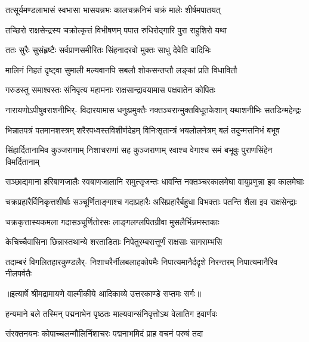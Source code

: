 \twolineshloka
{तत्सूर्यमण्डलाभासं स्वभासा भासयन्नभः}
{कालचक्रनिभं चक्रं मालेः शीर्षमपातयत्} %

\twolineshloka
{तच्छिरो राक्षसेन्द्रस्य चक्रोत्कृत्तं विभीषणम्}
{पपात रुधिरोद्गारि पुरा राहुशिरो यथा} %

\twolineshloka
{ततः सुरैः सुसंहृष्टैः सर्वप्राणसमीरितः}
{सिंहनादरवो मुक्तः साधु देवेति वादिभिः} %

\twolineshloka
{मालिनं निहतं दृष्ट्वा सुमाली मल्यवानपि}
{सबलौ शोकसन्तप्तौ लङ्कां प्रति विधावितौ} %

\twolineshloka
{गरुडस्तु समाश्वस्तः संनिवृत्य महामनाः}
{राक्षसान्द्रावयामास पक्षवातेन कोपितः} %

\fourlineindentedshloka
{नारायणोऽपीषुवराशनीभिर्-}
{विदारयामास धनुःप्रमुक्तैः}
{नक्तञ्चरान्मुक्तविधूतकेशान्}
{यथाशनीभिः सतडिन्महेन्द्रः} %

\fourlineindentedshloka
{भिन्नातपत्रं पतमानशस्त्रम्}
{शरैरपध्वस्तविशीर्णदेहम्}
{विनिःसृतान्त्रं भयलोलनेत्रम्}
{बलं तदुन्मत्तनिभं बभूव} %

\fourlineindentedshloka
{सिंहार्दितानामिव कुञ्जराणाम्}
{निशाचराणां सह कुञ्जराणाम्}
{रवाश्च वेगाश्च समं बभूवुः}
{पुराणसिंहेन विमर्दितानाम्} %

\fourlineindentedshloka
{सञ्छाद्यमाना हरिबाणजालैः}
{स्वबाणजालानि समुत्सृजन्तः}
{धावन्ति नक्तञ्चरकालमेघा}
{वायुप्रणुन्ना इव कालमेघाः} %

\fourlineindentedshloka
{चक्रप्रहारैर्विनिकृत्तशीर्षाः}
{सञ्चूर्णिताङ्गाश्च गदाप्रहारैः}
{असिप्रहारैर्बहुधा विभक्ताः}
{पतन्ति शैला इव राक्षसेन्द्राः} %

\twolineshloka
{चक्रकृत्तास्यकमला गदासञ्चूर्णितोरसः}
{लाङ्गलग्लपितग्रीवा मुसलैर्भिन्नमस्तकाः} %

\twolineshloka
{केचिच्चैवासिना छिन्नास्तथान्ये शरताडिताः}
{निपेतुरम्बरात्तूर्णं राक्षसाः सागराम्भसि} %

\fourlineindentedshloka
{तदाम्बरं विगलितहारकुण्डलैर्-}
{निशाचरैर्नीलबलाहकोपमैः}
{निपात्यमानैर्ददृशे निरन्तरम्}
{निपात्यमानैरिव नीलपर्वतैः} %


{॥इत्यार्षे श्रीमद्रामायणे वाल्मीकीये आदिकाव्ये उत्तरकाण्डे सप्तमः सर्गः॥}


\twolineshloka
{हन्यमाने बले तस्मिन् पद्मनाभेन पृष्ठतः}
{माल्यवान्संनिवृत्तोऽथ वेलातिग इवार्णवः} %

\twolineshloka
{संरक्तनयनः कोपाच्चलन्मौलिर्निशाचरः}
{पद्मनाभमिदं प्राह वचनं परुषं तदा} %

